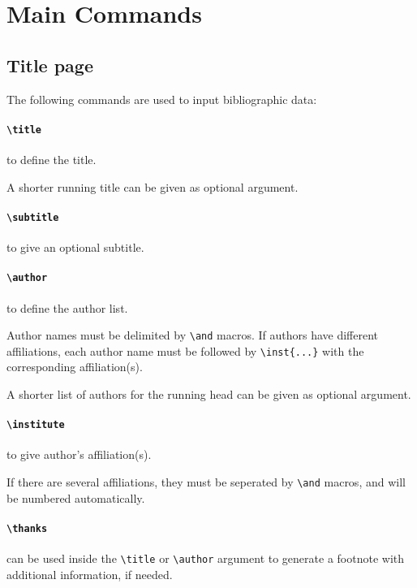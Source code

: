 \documentclass[preprint]{iacrtrans}
\begin{document}
\section{Main Commands}

\subsection{Title page}

The following commands are used to input bibliographic data:

\paragraph{\texttt{\textbackslash title}} to define the title.

A shorter running title can be given as optional argument.

\paragraph{\texttt{\textbackslash subtitle}} to give an optional
subtitle.

\paragraph{\texttt{\textbackslash author}} to define the author list.

Author names must be delimited by \verb+\and+ macros.  If authors
have different affiliations, each author name must be followed by
\verb+\inst{...}+ with the corresponding affiliation(s).

A shorter list of authors for the running head can be given as
optional argument.

\paragraph{\texttt{\textbackslash institute}} to give author's affiliation(s).

If there are several affiliations, they must be seperated by
\verb+\and+ macros, and will be numbered automatically.

\paragraph{\texttt{\textbackslash thanks}}
can be used inside the \verb+\title+ or
\verb+\author+ argument to generate a footnote with additional
information, if needed.
\end{document}
